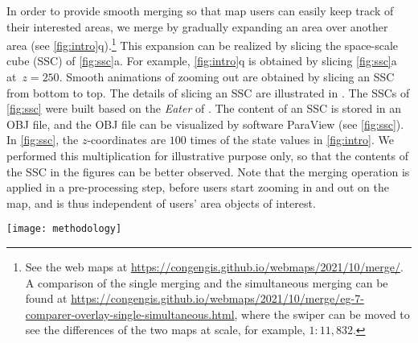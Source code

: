 \documentclass[twocolumn]{svjour3}          %
\begin{document}
In order to provide smooth merging
so that map users can easily keep track of their interested areas,
we merge by gradually expanding an area over another area
(see \fig\ref{fig:intro}q).\footnote{%
See the web maps at
\url{https://congengis.github.io/webmaps/2021/10/merge/}.
A comparison of the single merging and the simultaneous merging can be found at 
\url{https://congengis.github.io/webmaps/2021/10/merge/eg-7-comparer-overlay-single-simultaneous.html},
where the swiper can be moved to see the differences of the two maps at scale, 
for example, $1:11{,}832$.}
This expansion can be realized 
by slicing the space-scale cube (SSC) of
\fig\ref{fig:ssc}a.
For example,  \fig\ref{fig:intro}q is obtained by slicing
\fig\ref{fig:ssc}a at~$z= 250$.
Smooth animations of zooming out are obtained by
slicing an SSC from bottom to top.
The details of slicing an SSC are illustrated in \citet{Meijers2020Web}.
The SSCs of \fig\ref{fig:ssc} were built 
based on the \emph{Eater} of \citet{Suba2014Merge}.
The content of an SSC is stored in an OBJ file,
and the OBJ file can be visualized by software ParaView
(see \fig\ref{fig:ssc}).
In \fig\ref{fig:ssc}, the $z$-coordinates are $100$ times of
the state values in \fig\ref{fig:intro}.
We performed this multiplication for illustrative purpose only, 
so that the contents of the SSC in the figures can be better observed.
Note that the merging operation is applied in a pre-processing step, 
before users start zooming in and out on the map, 
and is thus independent of users' area objects of interest.




\begin{figure*}[tb]
\centering
\texttt{[image: methodology]}
\caption{A comparison of different scale-transition strategies.
Each arrow inside the subfigures indicates a merging operation.
The arrow in the right-hand side indicates the states of zooming out.
%
(a--c): All changes are processed in one go.
(d--j): All changes are sequenced one by one rapidly.
(k--o): Changes are grouped, resulting in more animation duration for every change.
%
The numbers are the face IDs. 
Note that the colors of the smaller areas
adapt to the colors of the larger areas during merging.
}
\label{fig:intro}
\end{figure*}
\end{document}
